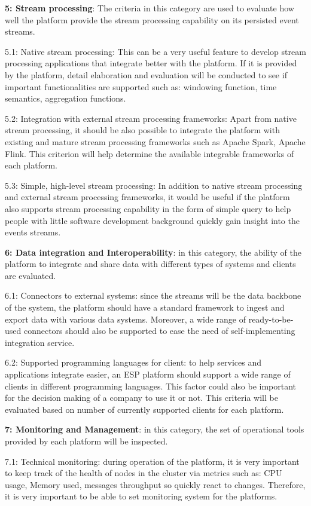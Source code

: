 \textbf{5: Stream processing}: The criteria in this category are used to evaluate how well the platform provide the stream processing capability on its persisted event streams.

5.1: Native stream processing: This can be a very useful feature to develop stream processing applications that integrate better with the platform. If it is provided by the platform, detail elaboration and evaluation will be conducted to see if important functionalities are supported such as: windowing function, time semantics, aggregation functions.

5.2: Integration with external stream processing frameworks: Apart from native stream processing, it should be also possible to integrate the platform with existing and mature stream processing frameworks such as Apache Spark, Apache Flink. This criterion will help determine the available integrable frameworks of each platform.

5.3: Simple, high-level stream processing: In addition to native stream processing and external stream processing frameworks, it would be useful if the platform also supports stream processing capability in the form of simple query to help people with little software development background quickly gain insight into the events streams. 

\textbf{6: Data integration and Interoperability}: in this category, the ability of the platform to integrate and share data with different types of systems and clients are evaluated.

6.1: Connectors to external systems: since the streams will be the data backbone of the system, the platform should have a standard framework to ingest and export data with various data systems. Moreover, a wide range of ready-to-be-used connectors should also be supported to ease the need of self-implementing integration service.

6.2: Supported programming languages for client: to help services and applications integrate easier, an ESP platform should support a wide range of clients in different programming languages. This factor could also be important for the decision making of a company to use it or not. This criteria will be evaluated based on number of currently supported clients for each platform.

\textbf{7: Monitoring and Management}: in this category, the set of operational tools provided by each platform will be inspected. 

7.1: Technical monitoring: during operation of the platform, it is very important to keep track of the health of nodes in the cluster via metrics such as: CPU usage, Memory used, messages throughput so quickly react to changes. Therefore, it is very important to be able to set monitoring system for the platforms.

